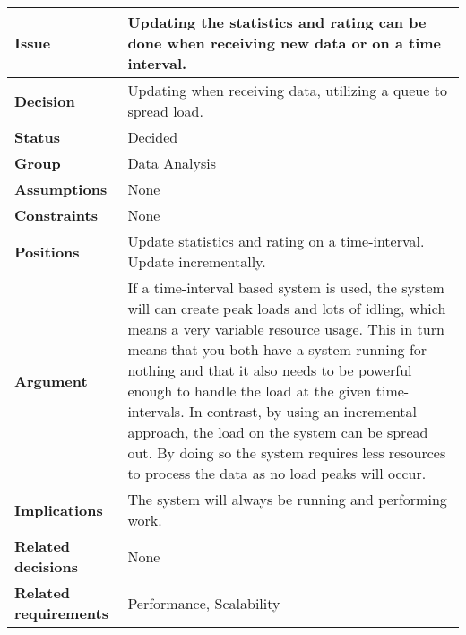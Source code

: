 
\label{dd:inc-or-time}
\begin{tabular}{ l  p{10cm}}
\hline
\bf Issue & Updating the statistics and rating can be done when receiving new data or on a time interval. \\
\hline
\bf Decision & Updating when receiving data, utilizing a queue to spread load. \\
\hline
\bf Status & Decided \\
\hline
\bf Group & Data Analysis \\
\hline
\bf Assumptions & None \\
\hline
\bf Constraints & None \\
\hline
\bf Positions & Update statistics and rating on a time-interval. \newline \newline
Update incrementally. \\
\hline
\bf Argument & If a time-interval based system is used, the system will can create peak loads and lots of idling, which means a very variable resource usage. This in turn means that you both have a system running for nothing and that it also needs to be powerful enough to handle the load at the given time-intervals. In contrast, by using an incremental approach, the load on the system can be spread out. By doing so the system requires less resources to process the data as no load peaks will occur. \\
\hline
\bf Implications & The system will always be running and performing work. \\
\hline
\bf Related decisions & None \\
\hline
\bf Related requirements  & Performance, Scalability \\
\hline
\end{tabular}
